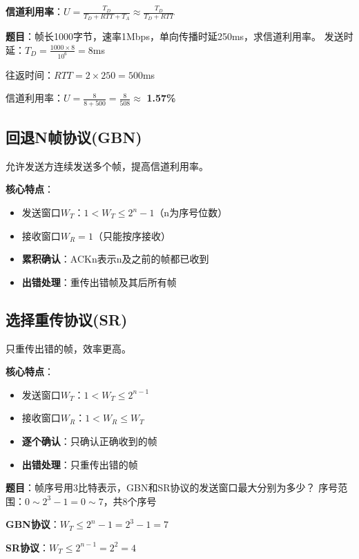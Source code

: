\begin{formulabox}
\textbf{信道利用率}：$U = \frac{T_D}{T_D + RTT + T_A} \approx \frac{T_D}{T_D + RTT}$
\end{formulabox}

\begin{examplebox}[例题3.2 停等协议效率]
\textbf{题目}：帧长1000字节，速率1Mbps，单向传播时延250ms，求信道利用率。
\tcblower
发送时延：$T_D = \frac{1000 \times 8}{10^6} = 8$ms

往返时间：$RTT = 2 \times 250 = 500$ms

信道利用率：$U = \frac{8}{8+500} = \frac{8}{508} \approx$ \textbf{1.57\%}
\end{examplebox}

\subsection{回退N帧协议(GBN)}
允许发送方连续发送多个帧，提高信道利用率。

\textbf{核心特点}：
\begin{itemize}[leftmargin=2em,itemsep=0pt]
    \item 发送窗口$W_T$：$1 < W_T \leq 2^n - 1$（n为序号位数）
    \item 接收窗口$W_R = 1$（只能按序接收）
    \item \textbf{累积确认}：ACKn表示n及之前的帧都已收到
    \item \textbf{出错处理}：重传出错帧及其后所有帧
\end{itemize}

\subsection{选择重传协议(SR)}
只重传出错的帧，效率更高。

\textbf{核心特点}：
\begin{itemize}[leftmargin=2em,itemsep=0pt]
    \item 发送窗口$W_T$：$1 < W_T \leq 2^{n-1}$
    \item 接收窗口$W_R$：$1 < W_R \leq W_T$
    \item \textbf{逐个确认}：只确认正确收到的帧
    \item \textbf{出错处理}：只重传出错的帧
\end{itemize}

\begin{examplebox}[例题3.3 窗口大小计算]
\textbf{题目}：帧序号用3比特表示，GBN和SR协议的发送窗口最大分别为多少？
\tcblower
序号范围：$0 \sim 2^3 - 1 = 0 \sim 7$，共8个序号

\textbf{GBN协议}：$W_T \leq 2^n - 1 = 2^3 - 1 = 7$

\textbf{SR协议}：$W_T \leq 2^{n-1} = 2^2 = 4$
\end{examplebox}


